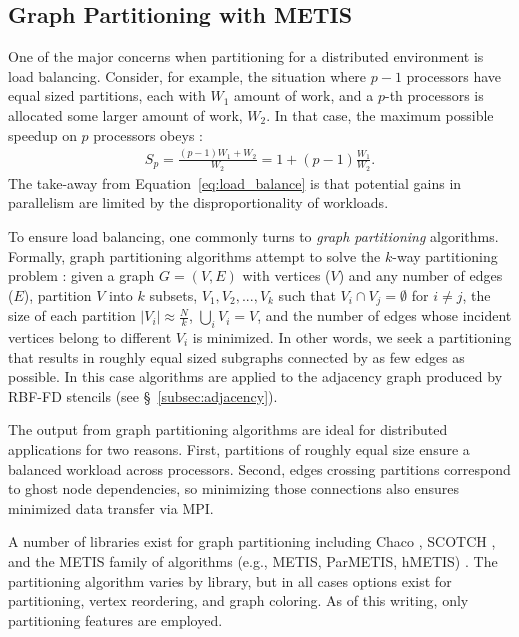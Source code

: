 \documentclass{report}
\begin{document}
\subsection{Graph Partitioning with METIS}

One of the major concerns when partitioning for a distributed environment is load balancing. Consider, for example, the situation where $p-1$ processors have equal sized partitions, each with $W_1$ amount of work, and a $p$-th processors is allocated some larger amount of work, $W_2$. In that case, the maximum possible speedup on $p$ processors obeys \cite{Gropp1990}:  
\begin{align}
S_p = \frac{(p-1) W_1 + W_2}{W_2} = 1 + (p-1)\frac{W_1}{W_2}.
\label{eq:load_balance}
\end{align}
The take-away from Equation~\ref{eq:load_balance} is that potential gains in parallelism are limited by the disproportionality of workloads. 

To ensure load balancing, one commonly turns to \emph{graph partitioning} algorithms. Formally, graph partitioning algorithms attempt to solve the $k$-way partitioning problem \cite{Karypis1999}: given a graph $G = (V,E)$ with vertices ($V$) and any number of edges ($E$), partition $V$ into $k$ subsets, $V_1, V_2, ..., V_k$ such that $V_i \cap V_j = \emptyset$ for $i \neq j$, the size of each partition $|V_i| \approx \frac{N}{k}$, $\bigcup_i V_i = V$, and the number of edges whose incident vertices belong to different $V_i$ is minimized. In other words, we seek a partitioning that results in roughly equal sized subgraphs connected by as few edges as possible. In this case algorithms are applied to the adjacency graph produced by RBF-FD stencils (see \S~\ref{subsec:adjacency}).

The output from graph partitioning algorithms are ideal for distributed applications for two reasons. First, partitions of roughly equal size ensure a balanced workload across processors. Second, edges crossing partitions correspond to ghost node dependencies, so minimizing those connections also ensures minimized data transfer via MPI. 

A number of libraries exist for graph partitioning including Chaco \cite{CHACO1995}, SCOTCH \cite{SCOTCH1996}, and the METIS family of algorithms (e.g., METIS, ParMETIS, hMETIS) \cite{Karypis1999}. The partitioning algorithm varies by library, but in all cases options exist for partitioning, vertex reordering, and graph coloring. As of this writing, only partitioning features are employed.
\end{document}
